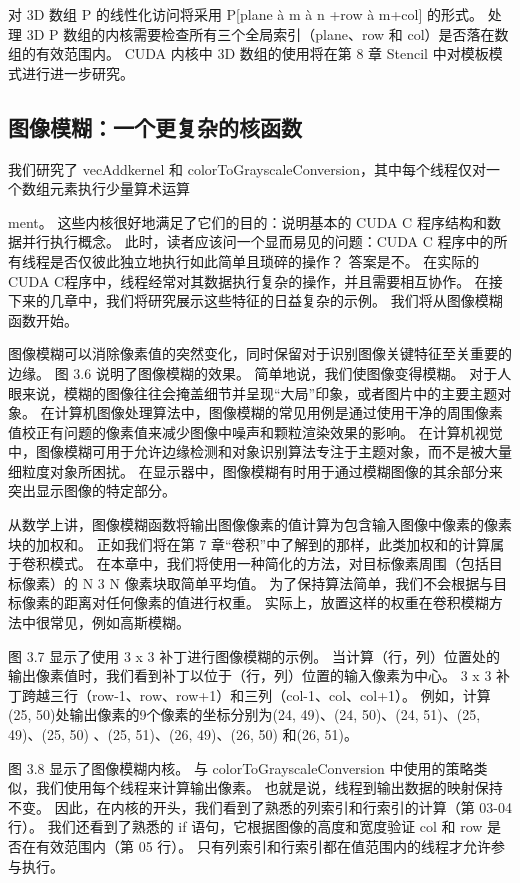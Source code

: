 对 3D 数组 P 的线性化访问将采用 P[plane à m à n +row à m+col] 的形式。 处理 3D P 数组的内核需要检查所有三个全局索引（plane、row 和 col）是否落在数组的有效范围内。 CUDA 内核中 3D 数组的使用将在第 8 章 Stencil 中对模板模式进行进一步研究。

\subsection{图像模糊：一个更复杂的核函数}
我们研究了 vecAddkernel 和 colorToGrayscaleConversion，其中每个线程仅对一个数组元素执行少量算术运算

ment。 这些内核很好地满足了它们的目的：说明基本的 CUDA C 程序结构和数据并行执行概念。 此时，读者应该问一个显而易见的问题：CUDA C 程序中的所有线程是否仅彼此独立地执行如此简单且琐碎的操作？ 答案是不。 在实际的CUDA C程序中，线程经常对其数据执行复杂的操作，并且需要相互协作。 在接下来的几章中，我们将研究展示这些特征的日益复杂的示例。 我们将从图像模糊函数开始。

图像模糊可以消除像素值的突然变化，同时保留对于识别图像关键特征至关重要的边缘。 图 3.6 说明了图像模糊的效果。 简单地说，我们使图像变得模糊。 对于人眼来说，模糊的图像往往会掩盖细节并呈现“大局”印象，或者图片中的主要主题对象。 在计算机图像处理算法中，图像模糊的常见用例是通过使用干净的周围像素值校正有问题的像素值来减少图像中噪声和颗粒渲染效果的影响。 在计算机视觉中，图像模糊可用于允许边缘检测和对象识别算法专注于主题对象，而不是被大量细粒度对象所困扰。 在显示器中，图像模糊有时用于通过模糊图像的其余部分来突出显示图像的特定部分。

从数学上讲，图像模糊函数将输出图像像素的值计算为包含输入图像中像素的像素块的加权和。 正如我们将在第 7 章“卷积”中了解到的那样，此类加权和的计算属于卷积模式。 在本章中，我们将使用一种简化的方法，对目标像素周围（包括目标像素）的 N 3 N 像素块取简单平均值。 为了保持算法简单，我们不会根据与目标像素的距离对任何像素的值进行权重。 实际上，放置这样的权重在卷积模糊方法中很常见，例如高斯模糊。

图 3.7 显示了使用 3 x 3 补丁进行图像模糊的示例。 当计算（行，列）位置处的输出像素值时，我们看到补丁以位于（行，列）位置的输入像素为中心。 3 x 3 补丁跨越三行（row-1、row、row+1）和三列（col-1、col、col+1）。 例如，计算(25, 50)处输出像素的9个像素的坐标分别为(24, 49)、(24, 50)、(24, 51)、(25, 49)、(25, 50) 、(25, 51)、(26, 49)、(26, 50) 和(26, 51)。

图 3.8 显示了图像模糊内核。 与 colorToGrayscaleConversion 中使用的策略类似，我们使用每个线程来计算输出像素。 也就是说，线程到输出数据的映射保持不变。 因此，在内核的开头，我们看到了熟悉的列索引和行索引的计算（第 03-04 行）。 我们还看到了熟悉的 if 语句，它根据图像的高度和宽度验证 col 和 row 是否在有效范围内（第 05 行）。 只有列索引和行索引都在值范围内的线程才允许参与执行。

